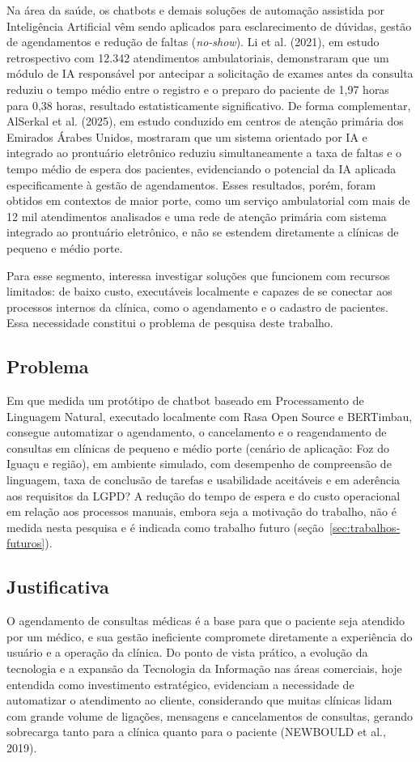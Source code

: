 \documentclass[12pt,a4paper]{extarticle}
\begin{document}
Na área da saúde, os chatbots e demais soluções de automação assistida por Inteligência Artificial vêm sendo aplicados para esclarecimento de dúvidas, gestão de agendamentos e redução de faltas (\textit{no-show}). Li et al. (2021), em estudo retrospectivo com 12.342 atendimentos ambulatoriais, demonstraram que um módulo de IA responsável por antecipar a solicitação de exames antes da consulta reduziu o tempo médio entre o registro e o preparo do paciente de 1,97 horas para 0,38 horas, resultado estatisticamente significativo. De forma complementar, AlSerkal et al. (2025), em estudo conduzido em centros de atenção primária dos Emirados Árabes Unidos, mostraram que um sistema orientado por IA e integrado ao prontuário eletrônico reduziu simultaneamente a taxa de faltas e o tempo médio de espera dos pacientes, evidenciando o potencial da IA aplicada especificamente à gestão de agendamentos. Esses resultados, porém, foram obtidos em contextos de maior porte, como um serviço ambulatorial com mais de 12 mil atendimentos analisados e uma rede de atenção primária com sistema integrado ao prontuário eletrônico, e não se estendem diretamente a clínicas de pequeno e médio porte. 

Para esse segmento, interessa investigar soluções que funcionem com recursos limitados: de baixo custo, executáveis localmente e capazes de se conectar aos processos internos da clínica, como o agendamento e o cadastro de pacientes. Essa necessidade constitui o problema de pesquisa deste trabalho.

\subsection{Problema}
Em que medida um protótipo de chatbot baseado em Processamento de Linguagem Natural, executado localmente com Rasa Open Source e BERTimbau, consegue automatizar o agendamento, o cancelamento e o reagendamento de consultas em clínicas de pequeno e médio porte (cenário de aplicação: Foz do Iguaçu e região), em ambiente simulado, com desempenho de compreensão de linguagem, taxa de conclusão de tarefas e usabilidade aceitáveis e em aderência aos requisitos da LGPD? A redução do tempo de espera e do custo operacional em relação aos processos manuais, embora seja a motivação do trabalho, não é medida nesta pesquisa e é indicada como trabalho futuro (seção~\ref{sec:trabalhos-futuros}).

\subsection{Justificativa}
O agendamento de consultas médicas é a base para que o paciente seja atendido por um médico, e sua gestão ineficiente compromete diretamente a experiência do usuário e a operação da clínica. Do ponto de vista prático, a evolução da tecnologia e a expansão da Tecnologia da Informação nas áreas comerciais, hoje entendida como investimento estratégico, evidenciam a necessidade de automatizar o atendimento ao cliente, considerando que muitas clínicas lidam com grande volume de ligações, mensagens e cancelamentos de consultas, gerando sobrecarga tanto para a clínica quanto para o paciente (NEWBOULD et al., 2019).
\end{document}
